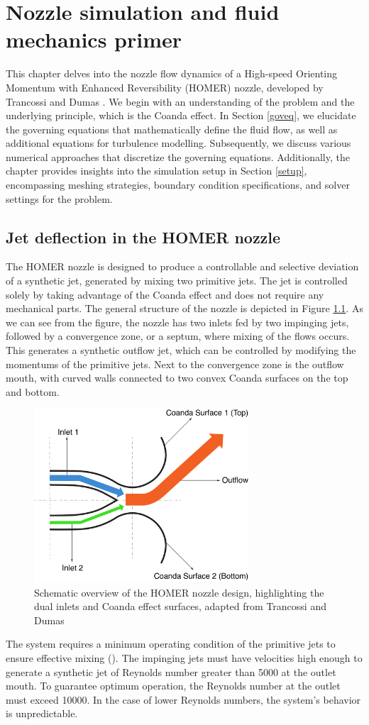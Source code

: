 \chapter{Nozzle simulation and fluid mechanics primer}
\label{chap:Theory-CFD}
This chapter delves into the nozzle flow dynamics of a High-speed Orienting Momentum with Enhanced Reversibility (HOMER) nozzle, developed by Trancossi and Dumas \cite{trandum}. We begin with an understanding of the problem and the underlying principle, which is the Coanda effect. In Section \ref{goveq}, we elucidate the governing equations that mathematically define the fluid flow, as well as additional equations for turbulence modelling. Subsequently, we discuss various numerical approaches that discretize the governing equations. Additionally, the chapter provides insights into the simulation setup in Section \ref{setup}, encompassing meshing strategies, boundary condition specifications, and solver settings for the problem. 
\section{Jet deflection in the HOMER nozzle}  
The HOMER nozzle is designed to produce a controllable and selective deviation of a synthetic jet, generated by mixing two primitive jets. The jet is controlled solely by taking advantage of the Coanda effect and does not require any mechanical parts. The general structure of the nozzle is depicted in Figure \ref{fig:nozzle}. As we can see from the figure, the nozzle has two inlets fed by two impinging jets, followed by a convergence zone, or a septum, where mixing of the flows occurs. This generates a synthetic outflow jet, which can be controlled by modifying the momentums of the primitive jets. Next to the convergence zone is the outflow mouth, with curved walls connected to two convex Coanda surfaces on the top and bottom.
\begin{figure}[ht]
  \centering
  \includegraphics[width=8cm]{images/Theory-CFD/nozzle.png}
  \caption{Schematic overview of the HOMER nozzle design, highlighting the dual inlets and Coanda effect surfaces, adapted from Trancossi and Dumas \cite{trandum}}
  \label{fig:nozzle}
\end{figure}
The system requires a minimum operating condition of the primitive jets to ensure effective mixing (\cite{trandum}). The impinging jets must have velocities high enough to generate a synthetic jet of Reynolds number greater than 5000 at the outlet mouth. To guarantee optimum operation, the Reynolds number at the outlet must exceed 10000. In the case of lower Reynolds numbers, the system's behavior is unpredictable. 

